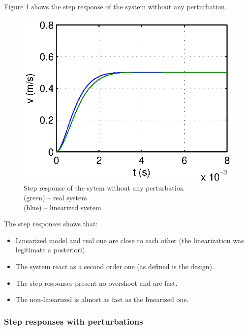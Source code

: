 Figure \ref{stepIdeal} shows the step response of the system without any perturbation. 

\begin{figure}[hb]
  \centering
  \includegraphics[width=\linewidth]{fig/step_design_Am.eps}
  \caption{Step response of the sytem without any perturbation \\ (green) -- real system \\ (blue) -- linearized system}
  \label{stepIdeal}
\end{figure}

The step responses shows that:
\begin{itemize}
 \item Linearized model and real one are close to each other (the linearization was legitimate a posteriori).
 \item The system react as a second order one (as defined is the design). 
 \item The step responses present no overshoot and are fast.
 \item The non-linearized is almost as fast as the linearized one.
\end{itemize}


\clearpage

\subsubsection*{Step responses with perturbations}

